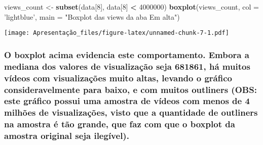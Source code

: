\documentclass[]{article}
\newenvironment{Shaded}{\begin{snugshade}}{\end{snugshade}}
\newcommand{\DataTypeTok}[1]{\textcolor[rgb]{0.13,0.29,0.53}{#1}}
\newcommand{\DecValTok}[1]{\textcolor[rgb]{0.00,0.00,0.81}{#1}}
\newcommand{\KeywordTok}[1]{\textcolor[rgb]{0.13,0.29,0.53}{\textbf{#1}}}
\newcommand{\NormalTok}[1]{#1}
\newcommand{\OperatorTok}[1]{\textcolor[rgb]{0.81,0.36,0.00}{\textbf{#1}}}
\newcommand{\StringTok}[1]{\textcolor[rgb]{0.31,0.60,0.02}{#1}}
\begin{document}
\begin{Shaded}
\begin{Highlighting}[]
\NormalTok{  views_count <-}\StringTok{ }\KeywordTok{subset}\NormalTok{(data[}\DecValTok{8}\NormalTok{], data[}\DecValTok{8}\NormalTok{] }\OperatorTok{<}\StringTok{ }\DecValTok{4000000}\NormalTok{)}
  \KeywordTok{boxplot}\NormalTok{(views_count, }\DataTypeTok{col =} \StringTok{'lightblue'}\NormalTok{, }\DataTypeTok{main =} \StringTok{"Boxplot das views da aba Em alta"}\NormalTok{)}
\end{Highlighting}
\end{Shaded}

\texttt{[image: Apresentação\_files/figure-latex/unnamed-chunk-7-1.pdf]}

\hypertarget{o-boxplot-acima-evidencia-este-comportamento.-embora-a-mediana-dos-valores-de-visualizacao-seja-681861-ha-muitos-videos-com-visualizacoes-muito-altas-levando-o-grafico-consideravelmente-para-baixo-e-com-muitos-outliners-obs-este-grafico-possui-uma-amostra-de-videos-com-menos-de-4-milhoes-de-visualizacoes-visto-que-a-quantidade-de-outliners-na-amostra-e-tao-grande-que-faz-com-que-o-boxplot-da-amostra-original-seja-ilegivel.}{%
\subsubsection{O boxplot acima evidencia este comportamento. Embora a
mediana dos valores de visualização seja 681861, há muitos vídeos com
visualizações muito altas, levando o gráfico consideravelmente para
baixo, e com muitos outliners (OBS: este gráfico possui uma amostra de
vídeos com menos de 4 milhões de visualizações, visto que a quantidade
de outliners na amostra é tão grande, que faz com que o boxplot da
amostra original seja
ilegível).}\label{o-boxplot-acima-evidencia-este-comportamento.-embora-a-mediana-dos-valores-de-visualizacao-seja-681861-ha-muitos-videos-com-visualizacoes-muito-altas-levando-o-grafico-consideravelmente-para-baixo-e-com-muitos-outliners-obs-este-grafico-possui-uma-amostra-de-videos-com-menos-de-4-milhoes-de-visualizacoes-visto-que-a-quantidade-de-outliners-na-amostra-e-tao-grande-que-faz-com-que-o-boxplot-da-amostra-original-seja-ilegivel.}}
\end{document}
